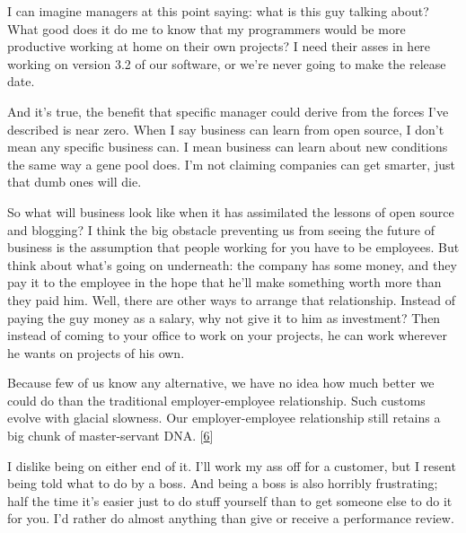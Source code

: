I can imagine managers
                  at this point saying: what is this guy talking about? What
                  good does it do me to know that my programmers would be more
                  productive working at home on their own projects? I need their
                  asses in here working on version 3.2 of our software, or we're
                  never going to make the release date.

And it's
                  true, the benefit that specific manager could derive from the
                  forces I've described is near zero. When I say business can
                  learn from open source, I don't mean any specific business
                  can. I mean business can learn about new conditions the same
                  way a gene pool does. I'm not claiming companies can get
                  smarter, just that dumb ones will die.

So what will
                  business look like when it has assimilated the lessons of open
                  source and blogging? I think the big obstacle preventing us
                  from seeing the future of business is the assumption that
                  people working for you have to be employees. But think about
                  what's going on underneath: the company has some money, and
                  they pay it to the employee in the hope that he'll make
                  something worth more than they paid him. Well, there are other
                  ways to arrange that relationship. Instead of paying the guy
                  money as a salary, why not give it to him as investment? Then
                  instead of coming to your office to work on your projects, he
                  can work wherever he wants on projects of his own.

Because
                  few of us know any alternative, we have no idea how much
                  better we could do than the traditional employer-employee
                  relationship. Such customs evolve with glacial slowness. Our
                  employer-employee relationship still retains a big chunk of
                  master-servant DNA.
                  [\href{\#f6n}{6}]

I dislike being on either end of it. I'll work my
                  ass off for a customer, but I resent being told what to do by
                  a boss. And being a boss is also horribly frustrating; half
                  the time it's easier just to do stuff yourself than to get
                  someone else to do it for you. I'd rather do almost anything
                  than give or receive a performance review.

